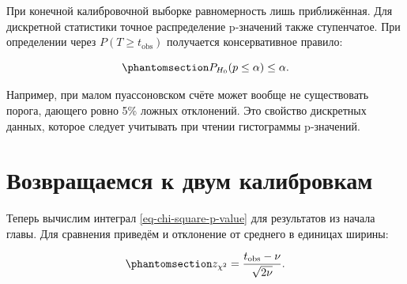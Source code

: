 \documentclass[
  russian,
  11pt,
  a4paper,
  open=any]{scrbook}
\begin{document}
При конечной калибровочной выборке равномерность лишь приближённая. Для
дискретной статистики точное распределение p-значений также ступенчатое.
При определении через \(P(T\ge t_{\mathrm{obs}})\) получается
консервативное правило:

\begin{equation}\protect\phantomsection\label{eq-ch13-discrete-p-values}{
P_{H_0}(p\le\alpha)\le\alpha.
}\end{equation}

Например, при малом пуассоновском счёте может вообще не существовать
порога, дающего ровно 5\% ложных отклонений. Это свойство дискретных
данных, которое следует учитывать при чтении гистограммы p-значений.

\section{Возвращаемся к двум
калибровкам}\label{ux432ux43eux437ux432ux440ux430ux449ux430ux435ux43cux441ux44f-ux43a-ux434ux432ux443ux43c-ux43aux430ux43bux438ux431ux440ux43eux432ux43aux430ux43c}

Теперь вычислим интеграл \ref{eq-chi-square-p-value} для результатов из
начала главы. Для сравнения приведём и отклонение от среднего в единицах
ширины:

\begin{equation}\protect\phantomsection\label{eq-ch13-standardized-chi-square}{
z_{\chi^2}=\frac{t_{\mathrm{obs}}-\nu}{\sqrt{2\nu}}.
}\end{equation}
\end{document}
